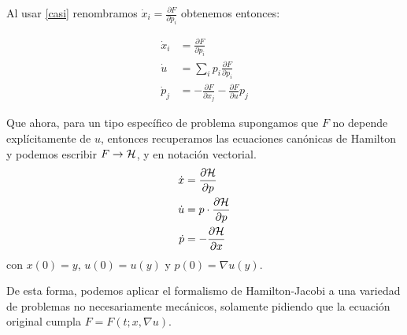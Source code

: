 Al usar \eqref{casi} renombramos $\dot x_i=\frac{\partial F}{\partial p_i}$ obtenemos entonces:

\begin{equation*}
	\begin{split}
		\dot x_i & =\frac{\partial F}{\partial p_i}                                   \\
		\dot{u}  & =\sum_i p_i\frac{\partial F}{\partial p_i}                         \\
		\dot p_j & =-\frac{\partial F}{\partial x_j}-\frac{\partial F}{\partial u}p_j
	\end{split}
\end{equation*}

Que ahora, para un tipo específico de problema supongamos que $F$ no depende explícitamente de $u$, entonces recuperamos las ecuaciones canónicas de Hamilton y podemos escribir $F\to\mathcal{H}$, y en notación vectorial.
\begin{equation*}
	\begin{split}
		\dot x  & =\frac{\partial \mathcal{H}}{\partial p}        \\
		\dot{u} & =p\cdot \frac{\partial \mathcal{H}}{\partial p} \\
		\dot p  & =-\frac{\partial \mathcal{H}}{\partial x}
	\end{split}
\end{equation*}
con $x(0)=y$, $u(0)=u(y)$ y $p(0)=\nabla u(y)$.

De esta forma, podemos aplicar el formalismo de Hamilton-Jacobi a una variedad de problemas no necesariamente mecánicos, solamente pidiendo que la ecuación original cumpla $F=F(t;x,\nabla u)$.
